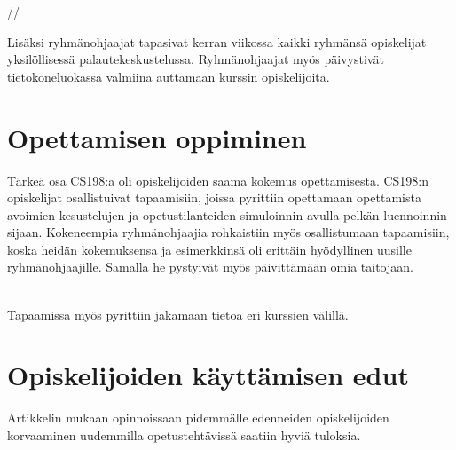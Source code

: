 \documentclass[finnish]{tktltiki2}
\theoremstyle{definition}
\theoremstyle{remark}
\begin{document}
//

Lisäksi ryhmänohjaajat tapasivat kerran viikossa kaikki ryhmänsä opiskelijat yksilöllisessä palautekeskustelussa. Ryhmänohjaajat myös päivystivät tietokoneluokassa valmiina auttamaan kurssin opiskelijoita.





\section{Opettamisen oppiminen}

Tärkeä osa CS198:a oli opiskelijoiden saama kokemus opettamisesta. CS198:n opiskelijat osallistuivat tapaamisiin, joissa pyrittiin opettamaan opettamista avoimien kesustelujen ja opetustilanteiden simuloinnin avulla pelkän luennoinnin sijaan. Kokeneempia ryhmänohjaajia rohkaistiin myös osallistumaan tapaamisiin, koska heidän kokemuksensa ja esimerkkinsä oli erittäin hyödyllinen uusille ryhmänohjaajille. Samalla he pystyivät myös päivittämään omia taitojaan. 

\\

Tapaamissa myös pyrittiin jakamaan tietoa eri kurssien välillä.


\section{Opiskelijoiden käyttämisen edut}

Artikkelin mukaan opinnoissaan pidemmälle edenneiden opiskelijoiden korvaaminen uudemmilla opetustehtävissä saatiin hyviä tuloksia.  





\end{document}
